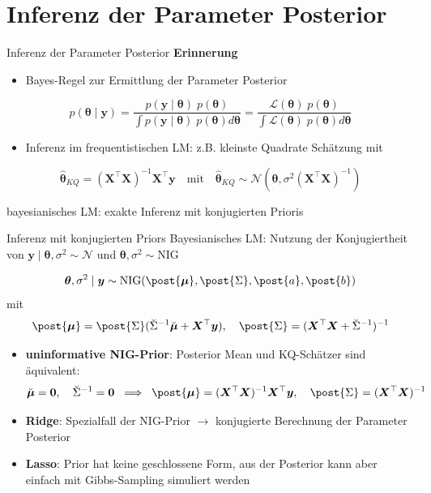 \documentclass[
  ignorenonframetext,
  aspectratio=169,
]{beamer}
\providecommand{\tightlist}{%
  \setlength{\itemsep}{0pt}\setlength{\parskip}{0pt}}
\newcommand{\bnull}{\bm{0}}
\newcommand{\by}{\bm{y}}
\newcommand{\bX}{\bm{X}}
\newcommand{\Lcal}{\mathcal{L}}
\newcommand{\Ncal}{\mathcal{N}}
\newcommand{\ssd}{\sigma^2}
\newcommand{\btheta}{\bm{\theta}}
\newcommand{\hbtheta}{\hat{\bm{\theta}}}
\newcommand{\mupri}{\breve{\bm{\mu}}}
\newcommand{\mupo}{\post{\bm{\mu}}}
\newcommand{\Sdpo}{\post{\Sigma}}
\newcommand{\Sdipri}{\breve{\Sigma}^{-1}}
\newcommand{\apo}{\post{a}}
\newcommand{\bpo}{\post{b}}
\begin{document}
\section{Inferenz der Parameter
Posterior}\label{inferenz-der-parameter-posterior}

\begin{frame}{Inferenz der Parameter Posterior}
\textbf{Erinnerung}

\begin{itemize}
\tightlist
\item
  Bayes-Regel zur Ermittlung der Parameter Posterior
\end{itemize}

\[
p(\btheta \mid \by) = \frac{p(\by \mid \btheta) \; p(\btheta)}{\int p(\by \mid \btheta) \; p(\btheta) d \btheta}
= \frac{\Lcal(\btheta) \; p(\btheta)}{\int \Lcal(\btheta) \; p(\btheta) d \btheta}
\]

\begin{itemize}
\tightlist
\item
  Inferenz im frequentistischen LM: z.B. kleinste Quadrate Schätzung mit
\end{itemize}

\[
\hbtheta_{KQ} = (\bX^\top \bX)^{-1} \bX^\top \by \quad \text{mit} \quad \hbtheta_{KQ} \sim \Ncal(\btheta, \ssd (\bX^\top \bX)^{-1})
\]
\end{frame}

\begin{frame}{bayesianisches LM: exakte Inferenz mit konjugierten
Prioris}
\protect{}\label{bayesianisches-lm-exakte-inferenz-mit-konjugierten-prioris}
\begin{block}{Inferenz mit konjugierten Priors}
\protect{}\label{inferenz-mit-konjugierten-priors}
Bayesianisches LM: Nutzung der Konjugiertheit von
\(\by \mid \btheta, \ssd \sim \Ncal\) und
\(\btheta, \ssd \sim \text{NIG}\)

\[
\btheta, \ssd \mid \by \sim \text{NIG}(\mupo, \Sdpo, \apo, \bpo)
\] mit \[
\mupo = \Sdpo (\Sdipri \mupri + \bX^\top \by), \quad \Sdpo = (\bX^\top \bX + \Sdipri)^{-1}
\]
\end{block}

\begin{itemize}
\tightlist
\item
  \textbf{uninformative NIG-Prior}: Posterior Mean und KQ-Schätzer sind
  äquivalent: \[
  \mupri = \bnull, \quad \Sdipri = \bnull \; \implies \; \mupo = (\bX^\top \bX)^{-1} \bX^\top \by,\quad \Sdpo = (\bX^\top \bX)^{-1}
  \]
\end{itemize}

\begin{itemize}
\tightlist
\item
  \textbf{Ridge}: Spezialfall der NIG-Prior \(\to\) konjugierte
  Berechnung der Parameter Posterior
\item
  \textbf{Lasso}: Prior hat keine geschlossene Form, aus der Posterior
  kann aber einfach mit Gibbs-Sampling simuliert werden
  \autocite{park_bayesian_2008}
\end{itemize}
\end{frame}
\end{document}
